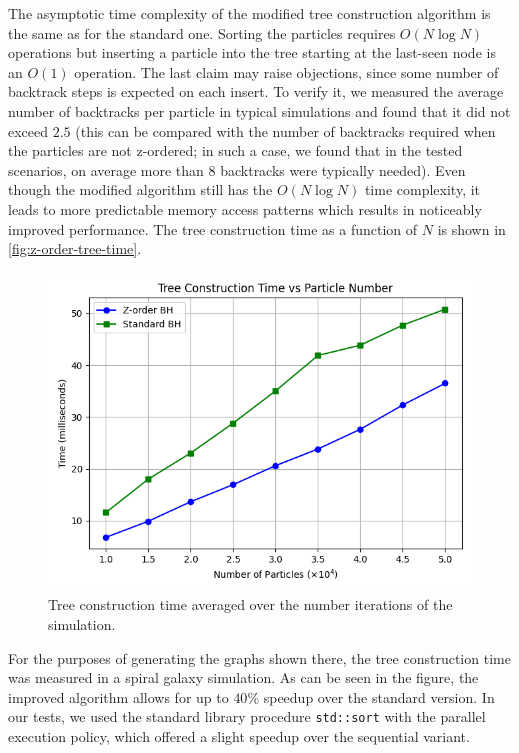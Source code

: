 The asymptotic time complexity of the modified tree construction algorithm is the same as for the standard one.
Sorting the particles requires $O(N\log N)$ operations but inserting a particle into the tree starting at the last-seen node is an $O(1)$ operation.
The last claim may raise objections, since some number of backtrack steps is expected on each insert.
To verify it, we measured the average number of backtracks per particle in typical simulations and found that it did not exceed $2.5$ (this can be compared with the number of backtracks required when the particles are not z-ordered; in such a case, we found that in the tested scenarios, on average more than 8 backtracks were typically needed).
Even though the modified algorithm still has the $O(N\log N)$ time complexity, it leads to more predictable memory access patterns which results in noticeably improved performance.
The tree construction time as a function of $N$ is shown in \autoref{fig:z-order-tree-time}.
\begin{figure}[htp]
    \centering
    \includegraphics[scale=0.5]{img/tree_construction_time.png}
    \caption{Tree construction time averaged over the number iterations of the simulation.}
    \label{fig:z-order-tree-time}
\end{figure}
For the purposes of generating the graphs shown there, the tree construction time was measured in a spiral galaxy simulation.
As can be seen in the figure, the improved algorithm allows for up to $40\%$ speedup over the standard version.
In our tests, we used the standard library procedure \texttt{std::sort} with the parallel execution policy, which offered a slight speedup over the sequential variant.
